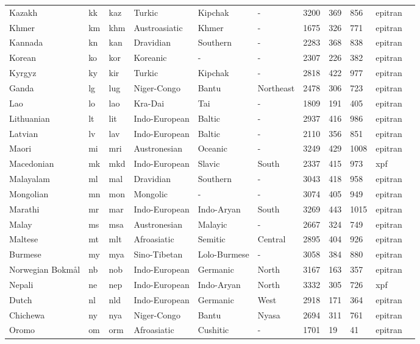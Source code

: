 \begin{longtable}{lllllllllll}
Kazakh & kk & kaz & Turkic & Kipchak & - & 3200 & 369 & 856 & epitran \\
Khmer & km & khm & Austroasiatic & Khmer & - & 1675 & 326 & 771 & epitran \\
Kannada & kn & kan & Dravidian & Southern & - & 2283 & 368 & 838 & epitran \\
Korean & ko & kor & Koreanic & - & - & 2307 & 226 & 382 & epitran \\
Kyrgyz & ky & kir & Turkic & Kipchak & - & 2818 & 422 & 977 & epitran \\
Ganda & lg & lug & Niger-Congo & Bantu & Northeast & 2478 & 306 & 723 & epitran \\
Lao & lo & lao & Kra-Dai & Tai & - & 1809 & 191 & 405 & epitran \\
Lithuanian & lt & lit & Indo-European & Baltic & - & 2937 & 416 & 986 & epitran \\
Latvian & lv & lav & Indo-European & Baltic & - & 2110 & 356 & 851 & epitran \\
Maori & mi & mri & Austronesian & Oceanic & - & 3249 & 429 & 1008 & epitran \\
Macedonian & mk & mkd & Indo-European & Slavic & South & 2337 & 415 & 973 & xpf \\
Malayalam & ml & mal & Dravidian & Southern & - & 3043 & 418 & 958 & epitran \\
Mongolian & mn & mon & Mongolic & - & - & 3074 & 405 & 949 & epitran \\
Marathi & mr & mar & Indo-European & Indo-Aryan & South & 3269 & 443 & 1015 & epitran \\
Malay & ms & msa & Austronesian & Malayic & - & 2667 & 324 & 749 & epitran \\
Maltese & mt & mlt & Afroasiatic & Semitic & Central & 2895 & 404 & 926 & epitran \\
Burmese & my & mya & Sino-Tibetan & Lolo-Burmese & - & 3058 & 384 & 880 & epitran \\
Norwegian Bokmål & nb & nob & Indo-European & Germanic & North & 3167 & 163 & 357 & epitran \\
Nepali & ne & nep & Indo-European & Indo-Aryan & North & 3332 & 305 & 726 & xpf \\
Dutch & nl & nld & Indo-European & Germanic & West & 2918 & 171 & 364 & epitran \\
Chichewa & ny & nya & Niger-Congo & Bantu & Nyasa & 2694 & 311 & 761 & epitran \\
Oromo & om & orm & Afroasiatic & Cushitic & - & 1701 & 19 & 41 & epitran \\

\end{longtable}
